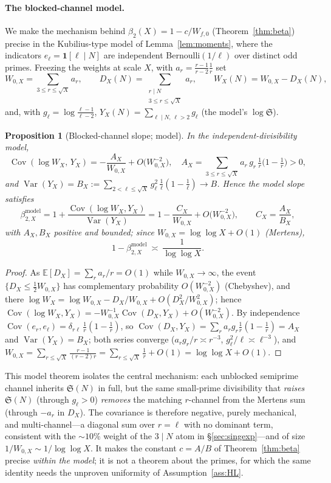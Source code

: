 \documentclass[]{interact}%
\newtheorem{proposition}{Proposition}
\newcommand{\sing}{\mathfrak S}
\newcommand{\Var}{\operatorname{Var}}
\begin{document}
\paragraph{The blocked-channel model.}
We make the mechanism behind $\beta_2(X)=1-c/W_{f,0}$ (Theorem~\ref{thm:beta})
precise in the Kubilius-type model of Lemma~\ref{lem:moments}, where the indicators
$e_\ell=\mathbf 1[\ell\mid N]$ are independent Bernoulli$(1/\ell)$ over distinct odd primes.
Freezing the weights at scale $X$, with $a_r=\frac{r-1}{r-2}\frac1r$ set
\[
  W_{0,X}=\!\!\sum_{3\le r\le\sqrt X}\!\!a_r,\qquad
  D_X(N)=\!\!\sum_{\substack{r\mid N\\3\le r\le\sqrt X}}\!\!a_r,\qquad
  W_X(N)=W_{0,X}-D_X(N),
\]
and, with $g_\ell=\log\frac{\ell-1}{\ell-2}$, $Y_X(N)=\sum_{\ell\mid N,\,\ell>2}g_\ell$ (the
model's $\log\sing$).

\begin{proposition}[Blocked-channel slope; model]\label{prop:blocked}
In the independent-divisibility model,
\[
  \operatorname{Cov}(\log W_X,\,Y_X)=-\frac{A_X}{W_{0,X}}+O\!\big(W_{0,X}^{-2}\big),
  \quad A_X=\!\!\sum_{3\le r\le\sqrt X}\!\!a_r\,g_r\,\tfrac1r\big(1-\tfrac1r\big)>0,
\]
and $\Var(Y_X)=B_X:=\sum_{2<\ell\le\sqrt X}g_\ell^2\,\tfrac1\ell(1-\tfrac1\ell)\to B$. Hence
the model slope satisfies
\[
  \beta_{2,X}^{\mathrm{model}}=1+\frac{\operatorname{Cov}(\log W_X,Y_X)}{\Var(Y_X)}
  =1-\frac{C_X}{W_{0,X}}+O\!\big(W_{0,X}^{-2}\big),\qquad C_X=\frac{A_X}{B_X},
\]
with $A_X,B_X$ positive and bounded; since $W_{0,X}=\log\log X+O(1)$ (Mertens),
\[
  \boxed{\,1-\beta_{2,X}^{\mathrm{model}}\ \asymp\ \frac1{\log\log X}.\,}
\]
\end{proposition}

\begin{proof}
As $\mathbb E[D_X]=\sum_r a_r/r=O(1)$ while $W_{0,X}\to\infty$, the event
$\{D_X\le\tfrac12 W_{0,X}\}$ has complementary probability $O(W_{0,X}^{-2})$ (Chebyshev), and
there $\log W_X=\log W_{0,X}-D_X/W_{0,X}+O(D_X^2/W_{0,X}^2)$; hence
$\operatorname{Cov}(\log W_X,Y_X)=-W_{0,X}^{-1}\operatorname{Cov}(D_X,Y_X)+O(W_{0,X}^{-2})$. By
independence $\operatorname{Cov}(e_r,e_\ell)=\delta_{r\ell}\,\tfrac1r(1-\tfrac1r)$, so
$\operatorname{Cov}(D_X,Y_X)=\sum_r a_rg_r\tfrac1r(1-\tfrac1r)=A_X$ and
$\Var(Y_X)=B_X$; both series converge ($a_rg_r/r\asymp r^{-3}$, $g_\ell^2/\ell\asymp\ell^{-3}$),
and $W_{0,X}=\sum_{r\le\sqrt X}\frac{r-1}{(r-2)r}=\sum_{r\le\sqrt X}\tfrac1r+O(1)=\log\log X+O(1)$.
\end{proof}

This model theorem isolates the central mechanism: each unblocked semiprime channel inherits
$\sing(N)$ in full, but the same small-prime divisibility that \emph{raises} $\sing(N)$
(through $g_\ell>0$) \emph{removes} the matching $r$-channel from the Mertens sum (through
$-a_r$ in $D_X$). The covariance is therefore negative, purely mechanical, and
multi-channel---a diagonal sum over $r=\ell$ with no dominant term, consistent with the
$\sim10\%$ weight of the $3\mid N$ atom in \S\ref{sec:singexp}---and of size
$1/W_{0,X}\sim1/\log\log X$. It makes the constant $c=A/B$ of Theorem~\ref{thm:beta} precise
\emph{within the model}; it is not a theorem about the primes, for which the same identity
needs the unproven uniformity of Assumption~\ref{ass:HL}.
\end{document}
